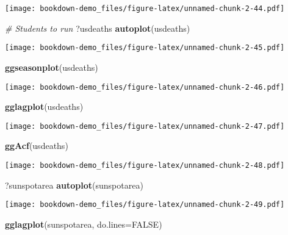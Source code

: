 \documentclass[]{book}
\newenvironment{Shaded}{\begin{snugshade}}{\end{snugshade}}
\newcommand{\CommentTok}[1]{\textcolor[rgb]{0.56,0.35,0.01}{\textit{#1}}}
\newcommand{\DataTypeTok}[1]{\textcolor[rgb]{0.13,0.29,0.53}{#1}}
\newcommand{\KeywordTok}[1]{\textcolor[rgb]{0.13,0.29,0.53}{\textbf{#1}}}
\newcommand{\NormalTok}[1]{#1}
\newcommand{\OtherTok}[1]{\textcolor[rgb]{0.56,0.35,0.01}{#1}}
\begin{document}
\texttt{[image: bookdown-demo\_files/figure-latex/unnamed-chunk-2-44.pdf]}

\begin{Shaded}
\begin{Highlighting}[]
\CommentTok{# Students to run }
\NormalTok{  ?usdeaths}
  \KeywordTok{autoplot}\NormalTok{(usdeaths)}
\end{Highlighting}
\end{Shaded}

\texttt{[image: bookdown-demo\_files/figure-latex/unnamed-chunk-2-45.pdf]}

\begin{Shaded}
\begin{Highlighting}[]
  \KeywordTok{ggseasonplot}\NormalTok{(usdeaths)}
\end{Highlighting}
\end{Shaded}

\texttt{[image: bookdown-demo\_files/figure-latex/unnamed-chunk-2-46.pdf]}

\begin{Shaded}
\begin{Highlighting}[]
  \KeywordTok{gglagplot}\NormalTok{(usdeaths)}
\end{Highlighting}
\end{Shaded}

\texttt{[image: bookdown-demo\_files/figure-latex/unnamed-chunk-2-47.pdf]}

\begin{Shaded}
\begin{Highlighting}[]
  \KeywordTok{ggAcf}\NormalTok{(usdeaths)}
\end{Highlighting}
\end{Shaded}

\texttt{[image: bookdown-demo\_files/figure-latex/unnamed-chunk-2-48.pdf]}

\begin{Shaded}
\begin{Highlighting}[]
\NormalTok{  ?sunspotarea}
  \KeywordTok{autoplot}\NormalTok{(sunspotarea)}
\end{Highlighting}
\end{Shaded}

\texttt{[image: bookdown-demo\_files/figure-latex/unnamed-chunk-2-49.pdf]}

\begin{Shaded}
\begin{Highlighting}[]
  \KeywordTok{gglagplot}\NormalTok{(sunspotarea, }\DataTypeTok{do.lines=}\OtherTok{FALSE}\NormalTok{)  }
\end{Highlighting}
\end{Shaded}
\end{document}
